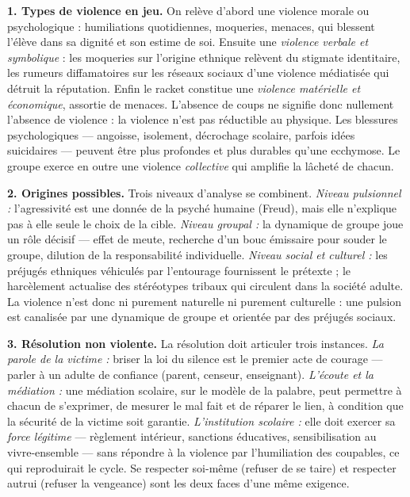 \documentclass[11pt]{article}
\newcommand{\cle}[1]{{\popxbold\color{popdark}#1}}
\begin{document}
\begin{corrige}

\textbf{1. Types de violence en jeu.} On relève d'abord une \cle{violence morale} ou psychologique : humiliations quotidiennes, moqueries, menaces, qui blessent l'élève dans sa dignité et son estime de soi. Ensuite une \emph{violence verbale et symbolique} : les moqueries sur l'origine ethnique relèvent du stigmate identitaire, les rumeurs diffamatoires sur les réseaux sociaux d'une violence médiatisée qui détruit la réputation. Enfin le racket constitue une \emph{violence matérielle et économique}, assortie de menaces. L'absence de coups ne signifie donc nullement l'absence de violence : la violence n'est pas réductible au physique. Les blessures psychologiques — angoisse, isolement, décrochage scolaire, parfois idées suicidaires — peuvent être plus profondes et plus durables qu'une ecchymose. Le groupe exerce en outre une violence \emph{collective} qui amplifie la lâcheté de chacun.

\textbf{2. Origines possibles.} Trois niveaux d'analyse se combinent. \emph{Niveau pulsionnel :} l'agressivité est une donnée de la psyché humaine (Freud), mais elle n'explique pas à elle seule le choix de la cible. \emph{Niveau groupal :} la dynamique de groupe joue un rôle décisif — effet de meute, recherche d'un bouc émissaire pour souder le groupe, dilution de la responsabilité individuelle. \emph{Niveau social et culturel :} les préjugés ethniques véhiculés par l'entourage fournissent le prétexte ; le harcèlement actualise des stéréotypes tribaux qui circulent dans la société adulte. La violence n'est donc ni purement naturelle ni purement culturelle : une pulsion est canalisée par une dynamique de groupe et orientée par des préjugés sociaux.

\textbf{3. Résolution non violente.} La résolution doit articuler trois instances. \emph{La parole de la victime :} briser la loi du silence est le premier acte de courage — parler à un adulte de confiance (parent, censeur, enseignant). \emph{L'écoute et la médiation :} une médiation scolaire, sur le modèle de la palabre, peut permettre à chacun de s'exprimer, de mesurer le mal fait et de réparer le lien, à condition que la sécurité de la victime soit garantie. \emph{L'institution scolaire :} elle doit exercer sa \emph{force légitime} — règlement intérieur, sanctions éducatives, sensibilisation au vivre-ensemble — sans répondre à la violence par l'humiliation des coupables, ce qui reproduirait le cycle. Se respecter soi-même (refuser de se taire) et respecter autrui (refuser la vengeance) sont les deux faces d'une même exigence.

\end{corrige}
\end{document}

